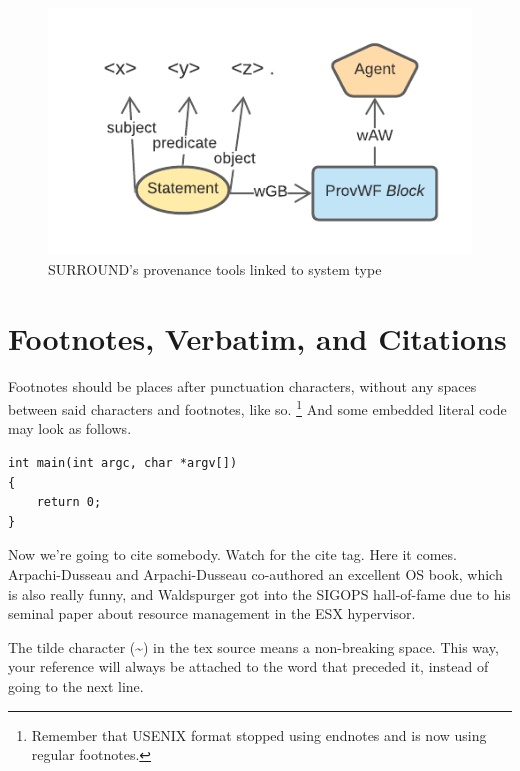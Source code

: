 \documentclass[letterpaper,twocolumn,10pt]{article}
\begin{document}
\begin{figure}
  \begin{center}
    \includegraphics[width=\textwidth]{images/reified-graph-data.png}
  \end{center}
  \caption{\label{fig:overview} SURROUND's provenance tools linked to system type}
  \end{figure}


\section{Footnotes, Verbatim, and Citations}

Footnotes should be places after punctuation characters, without any
spaces between said characters and footnotes, like so.%
\footnote{Remember that USENIX format stopped using endnotes and is
  now using regular footnotes.} And some embedded literal code may
look as follows.

\begin{verbatim}
int main(int argc, char *argv[]) 
{
    return 0;
}
\end{verbatim}

Now we're going to cite somebody. Watch for the cite tag. Here it
comes. Arpachi-Dusseau and Arpachi-Dusseau co-authored an excellent OS
book, which is also really funny, and
Waldspurger got into the SIGOPS hall-of-fame due to his seminal paper
about resource management in the ESX hypervisor.

The tilde character (\~{}) in the tex source means a non-breaking
space. This way, your reference will always be attached to the word
that preceded it, instead of going to the next line.
\end{document}
